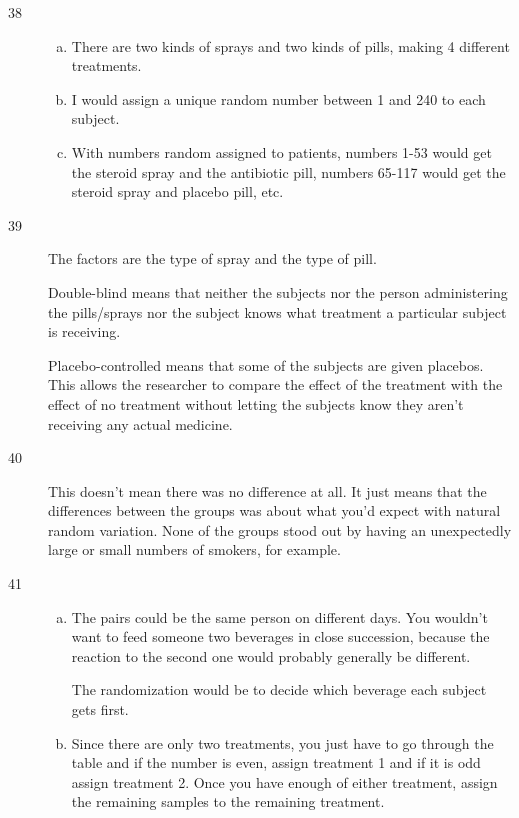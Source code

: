 \documentclass[letterpaper]{exam}
\begin{document}
\begin{description}
      \item[38]
        \begin{enumerate}[(a)]
          \item There are two kinds of sprays and two kinds of pills, making 4
            different treatments.  

          \item I would assign a unique random number between 1 and 240 to each
            subject.

          \item With numbers random assigned to patients, numbers 1-53 would get
            the steroid spray and the antibiotic pill, numbers 65-117 would get
            the steroid spray and placebo pill, etc.
        \end{enumerate}

      \item[39]
        The factors are the type of spray and the type of pill.

        Double-blind means that neither the subjects nor the person
        administering the pills/sprays nor the subject knows what treatment a
        particular subject is receiving.

        Placebo-controlled means that some of the subjects are given placebos.
        This allows the researcher to compare the effect of the treatment with
        the effect of no treatment without letting the subjects know they
        aren't receiving any actual medicine.

      \item[40] This doesn't mean there was no difference at all.  It just means
        that the differences between the groups was about what you'd expect with
        natural random variation.  None of the groups stood out by having an
        unexpectedly large or small numbers of smokers, for example.

      \item[41] 
        \begin{enumerate}[(a)]
          \item The pairs could be the same person on different days.  You
            wouldn't want to feed someone two beverages in close succession,
            because the reaction to the second one would probably generally be
            different.  
            
            The randomization would be to decide which beverage each subject
            gets first.

          \item Since there are only two treatments, you just have to go through
            the table and if the number is even, assign treatment 1 and if it is
            odd assign treatment 2.  Once you have enough of either treatment,
            assign the remaining samples to the remaining treatment.


\end{enumerate}
\end{description}
\end{document}
